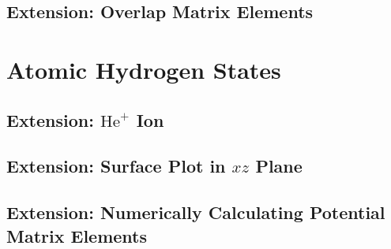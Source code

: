 \documentclass[]{article}
\begin{document}
\subsection{Extension: Overlap Matrix Elements}
\label{sec:extens-overl-matr}


\section{Atomic Hydrogen States}
\label{sec:atom-hydr-stat}




\subsection{Extension: $\mathrm{He}^{+}$ Ion}
\label{sec:extens-he+-ion}


\subsection{Extension: Surface Plot in $xz$ Plane}
\label{sec:extens-surface-plot-xz}


\subsection{Extension: Numerically Calculating Potential Matrix Elements}
\label{sec:extens-numer-calc-potent}

\end{document}
